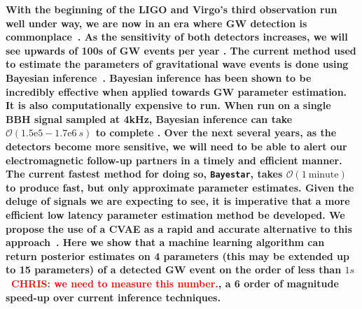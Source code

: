 \documentclass[%
showpacs,
 amsmath,amssymb,
 aps,
 twocolumn,
 prl,
 reprint,
floatfix,
]{revtex4-1}
\newcommand{\chris}[1]{\textbf{\textcolor{red}{CHRIS: #1}}}
\begin{document}
%
%
%
\textbf{ 
%
%
With the beginning of the \ac{LIGO} and
Virgo's third observation run well under way, we are now in an era where
\ac{GW} detection is commonplace~\cite{PhysRevLett.116.061102,
PhysRevX.6.041015,PhysRevLett.119.161101}. As the sensitivity of both detectors
increases, we will see upwards of 100s of \ac{GW} events per year \cite{1409.7215}.  The current
method used to estimate the parameters of gravitational wave events is done
using Bayesian inference~\cite{1409.7215}.
%
%
Bayesian inference has been shown to be incredibly effective when 
applied towards \ac{GW} parameter estimation. It is also computationally expensive 
to run. When run on a single \ac{BBH} signal sampled at 4kHz, Bayesian 
inference can take $\mathcal{O}(1.5\textrm{e}5 - 1.7\textrm{e}6\: s)$ to complete \cite{1409.7215}. 
Over the next several years, as the detectors become more sensitive, we will 
need to be able to alert our electromagnetic follow-up partners in a timely 
and efficient manner. The current fastest method for doing so, \texttt{Bayestar}, 
takes $\mathcal{O}(1\: \textrm{minute})$ to produce fast, but only approximate parameter estimates. 
Given the deluge of signals we are expecting to see, 
it is imperative that a more efficient low latency parameter estimation 
method be developed. We propose the use of a \ac{CVAE} as a rapid and accurate alternative to this
approach~\cite{1904.06264,1812.04405}. 
%
%
Here we show that a machine learning algorithm can return
posterior estimates on 4 parameters (this may be extended up to 15 parameters) of a detected \ac{GW} event on the order of less
than $1s$~\chris{we need to measure this number.}, a 6 order of magnitude speed-up over
current inference techniques.}
\end{document}
